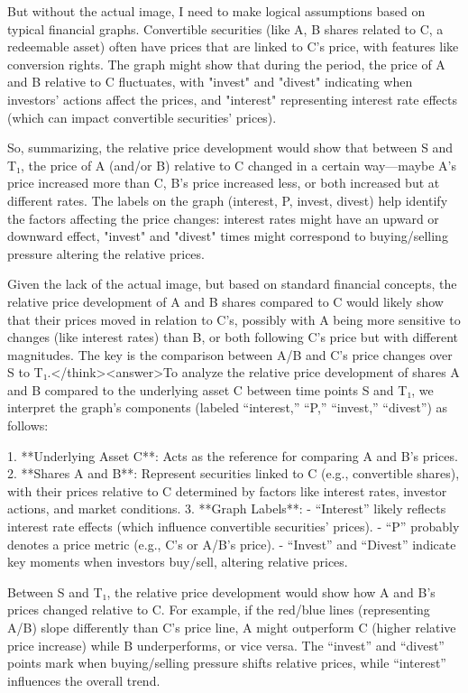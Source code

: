 But without the actual image, I need to make logical assumptions based on typical financial graphs. Convertible securities (like A, B shares related to C, a redeemable asset) often have prices that are linked to C's price, with features like conversion rights. The graph might show that during the period, the price of A and B relative to C fluctuates, with "invest" and "divest" indicating when investors' actions affect the prices, and "interest" representing interest rate effects (which can impact convertible securities' prices).

So, summarizing, the relative price development would show that between S and T₁, the price of A (and/or B) relative to C changed in a certain way—maybe A's price increased more than C, B's price increased less, or both increased but at different rates. The labels on the graph (interest, P, invest, divest) help identify the factors affecting the price changes: interest rates might have an upward or downward effect, "invest" and "divest" times might correspond to buying/selling pressure altering the relative prices.

Given the lack of the actual image, but based on standard financial concepts, the relative price development of A and B shares compared to C would likely show that their prices moved in relation to C's, possibly with A being more sensitive to changes (like interest rates) than B, or both following C's price but with different magnitudes. The key is the comparison between A/B and C's price changes over S to T₁.</think><answer>To analyze the relative price development of shares A and B compared to the underlying asset C between time points S and T₁, we interpret the graph’s components (labeled “interest,” “P,” “invest,” “divest”) as follows:  

1. **Underlying Asset C**: Acts as the reference for comparing A and B’s prices.  
2. **Shares A and B**: Represent securities linked to C (e.g., convertible shares), with their prices relative to C determined by factors like interest rates, investor actions, and market conditions.  
3. **Graph Labels**:  
   - “Interest” likely reflects interest rate effects (which influence convertible securities’ prices).  
   - “P” probably denotes a price metric (e.g., C’s or A/B’s price).  
   - “Invest” and “Divest” indicate key moments when investors buy/sell, altering relative prices.  

Between S and T₁, the relative price development would show how A and B’s prices changed relative to C. For example, if the red/blue lines (representing A/B) slope differently than C’s price line, A might outperform C (higher relative price increase) while B underperforms, or vice versa. The “invest” and “divest” points mark when buying/selling pressure shifts relative prices, while “interest” influences the overall trend.  

